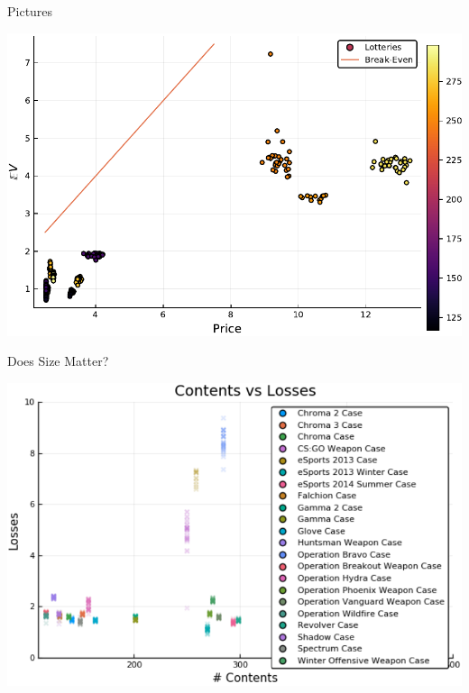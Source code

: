 \documentclass[presentation]{beamer}
\begin{document}
\begin{frame}[label={sec:org540482f}]{Pictures}
\begin{center}
\includegraphics[width=.9\linewidth]{../Plots/BreakEvenScatter.pdf}
\end{center}
\end{frame}

\begin{frame}[label={sec:org552ab08}]{Does Size Matter?}
\begin{center}
\includegraphics[width=.9\linewidth]{../Plots/LossesVSize.pdf}
\end{center}
\end{frame}
\end{document}
